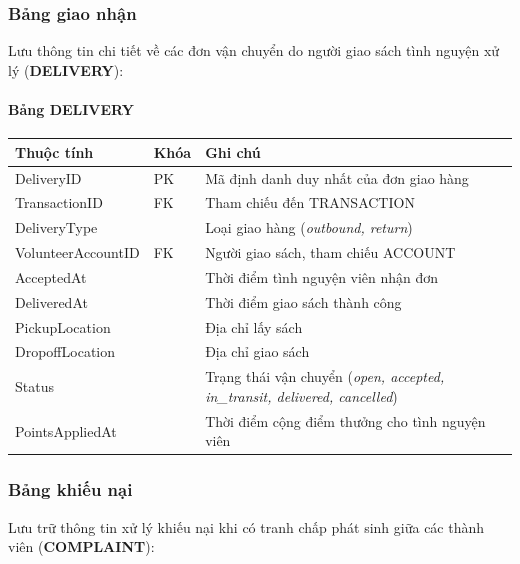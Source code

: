 \subsubsection{Bảng giao nhận}

Lưu thông tin chi tiết về các đơn vận chuyển do người giao sách tình nguyện xử lý (\textbf{DELIVERY}):

\paragraph{Bảng DELIVERY}
{\small
\begin{longtable}{L{0.28\textwidth}L{0.12\textwidth}L{0.52\textwidth}}
\toprule
\textbf{Thuộc tính} & \textbf{Khóa} & \textbf{Ghi chú} \\
\midrule
DeliveryID & PK & Mã định danh duy nhất của đơn giao hàng \\
TransactionID & FK & Tham chiếu đến TRANSACTION \\
DeliveryType & & Loại giao hàng (\textit{outbound, return}) \\
VolunteerAccountID & FK & Người giao sách, tham chiếu ACCOUNT \\
AcceptedAt & & Thời điểm tình nguyện viên nhận đơn \\
DeliveredAt & & Thời điểm giao sách thành công \\
PickupLocation & & Địa chỉ lấy sách \\
DropoffLocation & & Địa chỉ giao sách \\
Status & & Trạng thái vận chuyển (\textit{open, accepted, in\_transit, delivered, cancelled}) \\
PointsAppliedAt & & Thời điểm cộng điểm thưởng cho tình nguyện viên \\
\bottomrule
\end{longtable}
}

\subsubsection{Bảng khiếu nại}

Lưu trữ thông tin xử lý khiếu nại khi có tranh chấp phát sinh giữa các thành viên (\textbf{COMPLAINT}):

